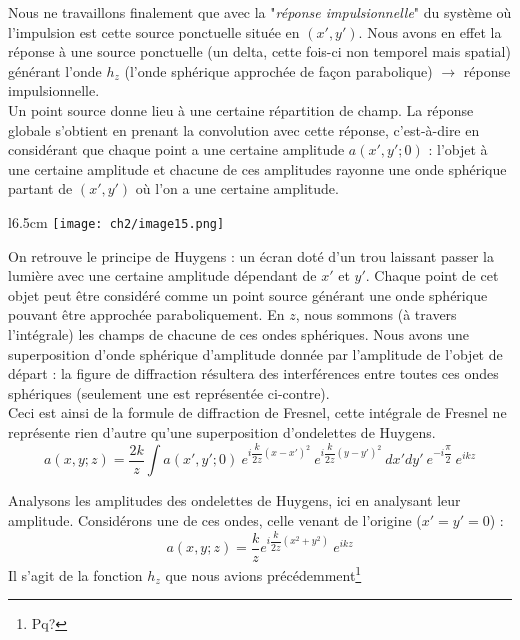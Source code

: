 Nous ne travaillons finalement que avec la "\textit{réponse impulsionnelle}" du système où 
l'impulsion est cette source ponctuelle située en $(x',y')$. Nous avons en effet la réponse 
à une source ponctuelle (un delta, cette fois-ci non temporel mais spatial) générant l'onde 
$h_z$ (l'onde sphérique approchée de façon parabolique) $\rightarrow$ réponse impulsionnelle.\\


Un point source donne lieu à une certaine répartition de champ. La réponse globale s'obtient en 
prenant la convolution avec cette réponse, c'est-à-dire en considérant que chaque point a une 
certaine amplitude $a(x',y';0)$ : l'objet à une certaine amplitude et chacune de ces amplitudes 
rayonne une onde sphérique partant de $(x',y')$ où l'on a une certaine amplitude. \\

\begin{wrapfigure}[9]{l}{6.5cm}
\vspace{-5mm}
\texttt{[image: ch2/image15.png]}
\end{wrapfigure}
On retrouve le 
principe de Huygens : un écran doté d'un trou laissant passer la lumière avec une certaine 
amplitude dépendant de $x'$ et $y'$. Chaque point de cet objet peut être considéré comme un point 
source générant une onde sphérique pouvant être approchée paraboliquement. En $z$, nous sommons 
(à travers l'intégrale) les champs de chacune de ces ondes sphériques. Nous avons une 
superposition d'onde sphérique d'amplitude donnée par l'amplitude de l'objet de départ : la 
figure de diffraction résultera des interférences entre toutes ces ondes sphériques (seulement une 
est représentée ci-contre).\\

Ceci est ainsi de la formule de diffraction de Fresnel, cette intégrale de Fresnel ne représente 
rien d'autre qu'une superposition d'ondelettes de Huygens.
\begin{equation}
a(x,y;z) = \frac{2k}{z}\int a(x',y';0)\ e^{i\dfrac{k}{2z}(x-x')^2}\
 e^{i\dfrac{k}{2z}(y-y')^2}\ dx'dy'\ e^{-i\dfrac{\pi}{2}}\ e^{ikz}
\end{equation}


Analysons les amplitudes des ondelettes de Huygens, ici en analysant leur amplitude. Considérons 
une de ces ondes, celle venant de l'origine ($x'=y'=0$) :
\begin{equation}
a(x,y;z) = \dfrac{k}{z}e^{i\dfrac{k}{2z}(x^2+y^2)}\ e^{ikz}
\end{equation}
Il s'agit de la fonction $h_z$ que nous avions précédemment\footnote{Pq?}



